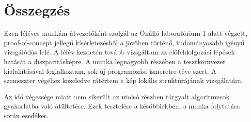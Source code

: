 \chapter*{Összegzés}\label{sect:conclusion}

Ezen féléves munkám átvezetőként szolgál az Önálló laboratórium 1 alatt végzett, proof-of-concept jellegű kísérletezésből a jövőben történő, tudományosabb igényű vizsgálódás felé.
A félév kezdetén tovább vizsgáltam az előfeldolgozási lépések hatását a diszparitásképre.
A munka legnagyobb részében a tesztkörnyezet kialakításával foglalkoztam, sok új programozási ismeretre téve szert.
A szemeszter végéhez közeledve rátértem a kép lokális struktúrájának vizsgálatára.

Az idő végessége miatt nem sikerült az utolsó részben tárgyalt algoritmusok gyakorlatba való átültetése.
Ezek tesztelése a későbbiekben, a munka folytatása során esedékes.